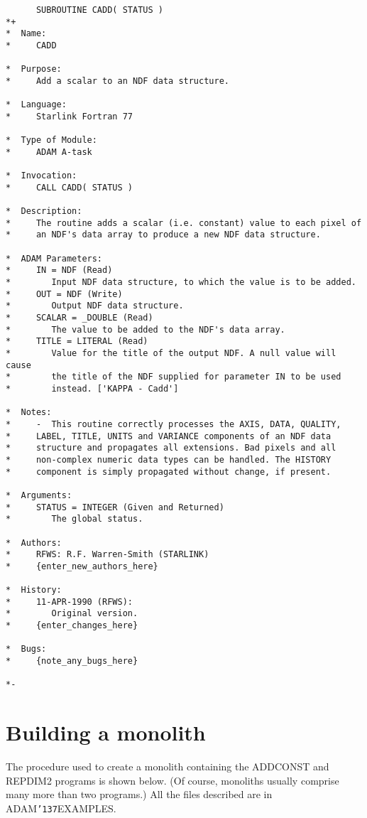 \documentclass[twoside,11pt]{article}
\renewcommand{\_}{{\tt\char'137}}
\newcommand{\xlabel}[1]{}
\begin{document}
\begin{verbatim}
      SUBROUTINE CADD( STATUS )
*+
*  Name:
*     CADD

*  Purpose:
*     Add a scalar to an NDF data structure.

*  Language:
*     Starlink Fortran 77

*  Type of Module:
*     ADAM A-task

*  Invocation:
*     CALL CADD( STATUS )

*  Description:
*     The routine adds a scalar (i.e. constant) value to each pixel of
*     an NDF's data array to produce a new NDF data structure.

*  ADAM Parameters:
*     IN = NDF (Read)
*        Input NDF data structure, to which the value is to be added.
*     OUT = NDF (Write)
*        Output NDF data structure.
*     SCALAR = _DOUBLE (Read)
*        The value to be added to the NDF's data array.
*     TITLE = LITERAL (Read)
*        Value for the title of the output NDF. A null value will cause
*        the title of the NDF supplied for parameter IN to be used
*        instead. ['KAPPA - Cadd']

*  Notes:
*     -  This routine correctly processes the AXIS, DATA, QUALITY,
*     LABEL, TITLE, UNITS and VARIANCE components of an NDF data
*     structure and propagates all extensions. Bad pixels and all
*     non-complex numeric data types can be handled. The HISTORY
*     component is simply propagated without change, if present.

*  Arguments:
*     STATUS = INTEGER (Given and Returned)
*        The global status.

*  Authors:
*     RFWS: R.F. Warren-Smith (STARLINK)
*     {enter_new_authors_here}

*  History:
*     11-APR-1990 (RFWS):
*        Original version.
*     {enter_changes_here}

*  Bugs:
*     {note_any_bugs_here}

*-
\end{verbatim}

\newpage
\section{Building a monolith\label{monolith}\xlabel{building_a_monolith}}

The procedure used to create a monolith containing the ADDCONST and REPDIM2
programs is shown below.
(Of course, monoliths usually comprise many more than two programs.)
All the files described are in ADAM\_EXAMPLES.
\end{document}
